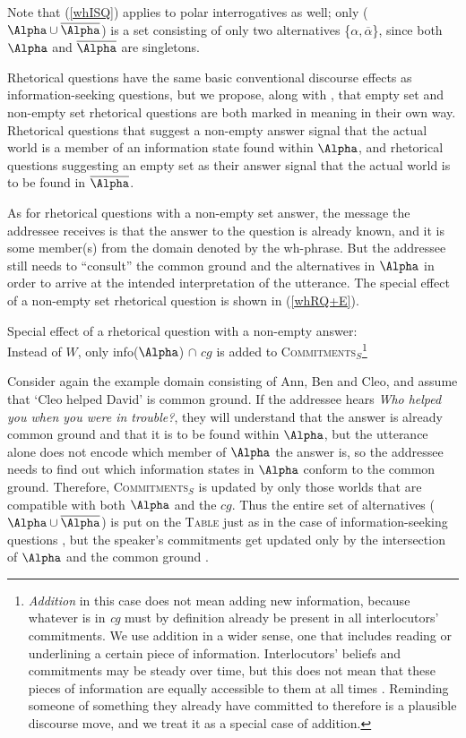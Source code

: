 \documentclass[output=paper,colorlinks,citecolor=brown            ,chinesefont]{langscibook}
\begin{document}
Note that (\ref{whISQ}) applies to polar interrogatives as well; only 
($\Alpha\cup\overline{\Alpha}$) is a set consisting of only two alternatives \{$\alpha, \overline{\alpha}$\}, since both $\Alpha$ and $\overline{\Alpha}$ are singletons.

Rhetorical questions have the same basic conventional discourse effects as information-seeking questions, but we propose, along with \citet{Jamieson2018phd}, that empty set and non-empty set rhetorical questions are both marked in meaning in their own way. Rhetorical questions that suggest a non-empty answer signal that the actual world is a member of an information state found within $\Alpha$, and rhetorical questions suggesting an empty set as their answer signal that the actual world is to be found in $\overline{\Alpha}$.

As for rhetorical questions with a non-empty set answer, the message the addressee receives is that the answer to the question is already known, and it is some member(s) from the domain denoted by the wh-phrase. But the addressee still needs to ``consult'' the common ground and the alternatives in $\Alpha$ in order to arrive at the intended interpretation of the utterance. The special effect of a non-empty set rhetorical question is shown in (\ref{whRQ+E}).

\begin{exe}
\ex\label{whRQ+E} Special effect of a rhetorical question with a non-empty answer: \\
Instead of $W$, only info($\Alpha$) $\cap$ $cg$ is added to \textsc{Commitments}$_S$\footnote{\textit{Addition} in this case does not mean adding new information, because whatever is in \textit{cg} must by definition already be present in all interlocutors' commitments. We use addition in a wider sense, one that includes reading or underlining a certain piece of information. Interlocutors' beliefs and commitments may be steady over time, but this does not mean that these pieces of information are equally accessible to them at all times \citep{Clark1996}. Reminding someone of something they already have committed to therefore is a plausible discourse move, and we treat it as a special case of addition.}
\end{exe}

Consider again the example domain consisting of Ann, Ben and Cleo, and assume that `Cleo helped David' is common ground. If the addressee hears \textit{Who helped you when you were in trouble?}, they will understand that the answer is already common ground and that it is to be found within $\Alpha$, but the utterance alone does not encode which member of $\Alpha$ the answer is, so the addressee needs to find out which information states in $\Alpha$ conform to the common ground. Therefore, \textsc{Commitments}$_S$ is updated by only those worlds that are compatible with both $\Alpha$ and the $cg$. Thus the entire set of alternatives ($\Alpha\cup\overline{\Alpha}$) is put on the \textsc{Table} just as in the case of information-seeking questions , but the speaker's commitments get updated only by the intersection of $\Alpha$ and the common ground . 
\end{document}
